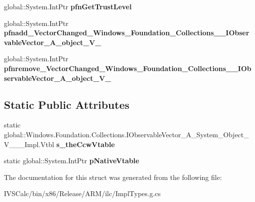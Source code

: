 \begin{DoxyCompactItemize}
global\+::\+System.\+Int\+Ptr {\bfseries pfn\+Get\+Trust\+Level}
\item 
\mbox{\label{struct_windows_1_1_foundation_1_1_collections_1_1_i_observable_vector___a___system___object___v_______impl_1_1_vtbl_ac236d64866316fe7cdcf57ef5c5b0536}} 
global\+::\+System.\+Int\+Ptr {\bfseries pfnadd\+\_\+\+Vector\+Changed\+\_\+\+Windows\+\_\+\+Foundation\+\_\+\+Collections\+\_\+\+\_\+\+I\+Observable\+Vector\+\_\+\+A\+\_\+object\+\_\+\+V\+\_\+}
\item 
\mbox{\label{struct_windows_1_1_foundation_1_1_collections_1_1_i_observable_vector___a___system___object___v_______impl_1_1_vtbl_ab490d21f1c40ca1b6ff87da6d480bb81}} 
global\+::\+System.\+Int\+Ptr {\bfseries pfnremove\+\_\+\+Vector\+Changed\+\_\+\+Windows\+\_\+\+Foundation\+\_\+\+Collections\+\_\+\+\_\+\+I\+Observable\+Vector\+\_\+\+A\+\_\+object\+\_\+\+V\+\_\+}
\end{DoxyCompactItemize}
\subsection*{Static Public Attributes}
\begin{DoxyCompactItemize}
\item 
\mbox{\label{struct_windows_1_1_foundation_1_1_collections_1_1_i_observable_vector___a___system___object___v_______impl_1_1_vtbl_a6b175753eb262ebb50bed5c6e02e08a0}} 
static global\+::\+Windows.\+Foundation.\+Collections.\+I\+Observable\+Vector\+\_\+\+A\+\_\+\+System\+\_\+\+Object\+\_\+\+V\+\_\+\+\_\+\+\_\+\+Impl.\+Vtbl {\bfseries s\+\_\+the\+Ccw\+Vtable}
\item 
\mbox{\label{struct_windows_1_1_foundation_1_1_collections_1_1_i_observable_vector___a___system___object___v_______impl_1_1_vtbl_a43d053f36a1751e9c5c1f749a8a46c22}} 
static global\+::\+System.\+Int\+Ptr {\bfseries p\+Native\+Vtable}
\end{DoxyCompactItemize}


The documentation for this struct was generated from the following file\+:\begin{DoxyCompactItemize}
\item 
I\+V\+S\+Calc/bin/x86/\+Release/\+A\+R\+M/ilc/Impl\+Types.\+g.\+cs\end{DoxyCompactItemize}
